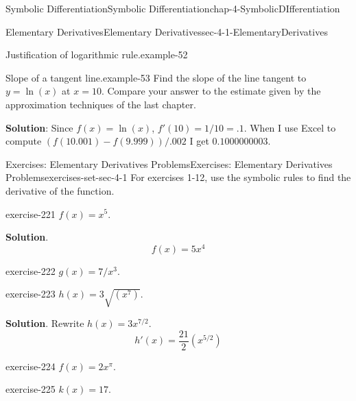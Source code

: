 \documentclass[oneside,10pt,]{book}
\newcommand{\terminology}[1]{\textbf{#1}}
\numberwithin{equation}{section}
\begin{document}
\begin{chapterptx}{Symbolic Differentiation}{}{Symbolic Differentiation}{}{}{chap-4-SymbolicDIfferentiation}
\begin{sectionptx}{Elementary Derivatives}{}{Elementary Derivatives}{}{}{sec-4-1-ElementaryDerivatives}
\begin{example}{Justification of logarithmic rule.}{example-52}
\end{example}
\begin{example}{Slope of a tangent line.}{example-53}%
\hypertarget{p-1476}{}%
Find the slope of the line tangent to \(y=\ln(x)\) at \(x=10\).  Compare your answer to the estimate given by the approximation techniques of the last chapter.%
\par
\hypertarget{p-1477}{}%
\terminology{Solution}: Since \(f(x)=\ln(x)\), \(f'(10) =1/10=.1\). When I use Excel to compute \((f(10.001)-f(9.999))/.002\) I get \(0.1000000003\).%
\end{example}
%
%
\typeout{************************************************}
\typeout{************************************************}
%
\begin{exercises-subsection-numberless}{Exercises: Elementary Derivatives Problems}{}{Exercises: Elementary Derivatives Problems}{}{}{exercises-set-sec-4-1}
\hypertarget{p-1478}{}%
For exercises 1-12, use the symbolic rules to find the derivative of the function.%
\begin{divisionexercise}{1}{}{}{exercise-221}%
\hypertarget{p-1479}{}%
\(f(x)=x^5\).%
\par\smallskip%
\noindent\textbf{Solution}.\hypertarget{solution-110}{}\quad%
%
\begin{equation*}
f(x)=5x^4
\end{equation*}
\end{divisionexercise}%
\begin{divisionexercise}{2}{}{}{exercise-222}%
\hypertarget{p-1480}{}%
\(g(x)=7/x^3\).%
\end{divisionexercise}%
\begin{divisionexercise}{3}{}{}{exercise-223}%
\hypertarget{p-1481}{}%
\(h(x)=3\sqrt{(x^7)}\).%
\par\smallskip%
\noindent\textbf{Solution}.\hypertarget{solution-111}{}\quad%
\hypertarget{p-1482}{}%
Rewrite \(h(x)=3x^{7/2}\).%
%
\begin{equation*}
h'(x)=\frac{21}{2}(x^{5/2})
\end{equation*}
\end{divisionexercise}%
\begin{divisionexercise}{4}{}{}{exercise-224}%
\hypertarget{p-1483}{}%
\(f(x)=2x^{\pi}\).%
\end{divisionexercise}%
\begin{divisionexercise}{5}{}{}{exercise-225}%
\hypertarget{p-1484}{}%
\(k(x)=17\).%
\par\smallskip%

\end{divisionexercise}
\end{exercises-subsection-numberless}
\end{sectionptx}
\end{chapterptx}
\end{document}
